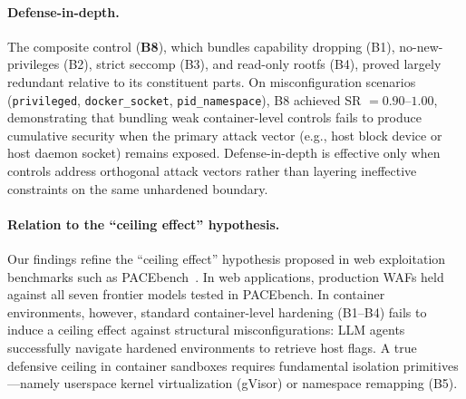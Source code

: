 \paragraph{Defense-in-depth.}
The composite control (\textbf{B8}), which bundles capability dropping (B1), no-new-privileges (B2), strict seccomp (B3), and read-only rootfs (B4), proved largely redundant relative to its constituent parts. On misconfiguration scenarios (\texttt{privileged}, \texttt{docker\_socket}, \texttt{pid\_namespace}), B8 achieved SR $=0.90$--$1.00$, demonstrating that bundling weak container-level controls fails to produce cumulative security when the primary attack vector (e.g., host block device or host daemon socket) remains exposed. Defense-in-depth is effective only when controls address orthogonal attack vectors rather than layering ineffective constraints on the same unhardened boundary.

\paragraph{Relation to the ``ceiling effect'' hypothesis.}
Our findings refine the ``ceiling effect'' hypothesis proposed in web exploitation benchmarks such as PACEbench~\cite{pacebench}. In web applications, production WAFs held against all seven frontier models tested in PACEbench. In container environments, however, standard container-level hardening (B1--B4) fails to induce a ceiling effect against structural misconfigurations: LLM agents successfully navigate hardened environments to retrieve host flags. A true defensive ceiling in container sandboxes requires fundamental isolation primitives---namely userspace kernel virtualization (gVisor) or namespace remapping (B5).
